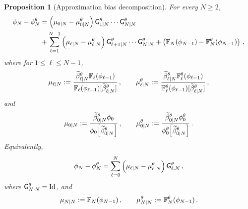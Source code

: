 \documentclass[11pt]{article}
\theoremstyle{plain}
\newtheorem{proposition}[theorem]{Proposition}
\theoremstyle{definition}
\theoremstyle{remark}
\begin{document}
\begin{proposition}[Approximation bias decomposition]
\label{prop:filtering_error_decomposition}
For every $N\ge 2$,
\begin{align*}
\filter{N} - \approxfilter{N}
&= \left( \muBias{0}{N} - \muBias{0}{N}[\theta] \right)  \fsmk{1}{N}[\theta] \cdots \fsmk{N}{N}[\theta] \\
& + \sum_{\ell=1}^{N-1} \left( \muBias{\ell}{N} - \muBias{\ell}{N}[\theta] \right) \fsmk{\ell+1}{N}[\theta] \cdots \fsmk{N}{N}[\theta] + \left( \filtertransform{N} (\filter{N-1}) - \filtertransform{N}[\theta] (\filter{N-1})\right) \eqsp,
\end{align*}
where for $1\le \ell\le N-1$,
$$
\muBias{\ell}{N}
\eqdef \frac{ \normbackwardfun{\ell}{N}[\theta] \filtertransform{\ell} (\filter{\ell-1}) }{ \filtertransform{\ell}(\filter{\ell-1}) [ \normbackwardfun{\ell}{N}[\theta] ] } \eqsp,
\qquad
\muBias{\ell}{N}[\theta] \eqdef \frac{ \normbackwardfun{\ell}{N}[\theta] \filtertransform{\ell}[\theta] (\filter{\ell-1}) }{ \filtertransform{\ell}[\theta](\filter{\ell-1}) [ \normbackwardfun{\ell}{N}[\theta] ] } \eqsp,
$$
and
$$
\muBias{0}{N} \eqdef \frac{ \normbackwardfun{0}{N}[\theta]\filter{0} }{ \filter{0}[\normbackwardfun{0}{N}[\theta]] } \eqsp, 
\qquad
\muBias{0}{N}[\theta] \eqdef \frac{ \normbackwardfun{0}{N}[\theta]\approxfilter{0} }{ \approxfilter{0}[\normbackwardfun{0}{N}[\theta]] } \eqsp.
$$
%
Equivalently,
\begin{align}
\label{eq:kernel_bias_decomposition_approx_forgetting}
\filter{N}-\approxfilter{N} = \sum_{\ell=0}^{N} \left( \muBias{\ell}{N} - \muBias{\ell}{N}[\theta] \right) \prodfsmk{\ell}{N}[\theta] \eqsp,
\end{align}
where $\prodfsmk{N}{N}[\theta]=\operatorname{Id}$, and
$$
\muBias{N}{N} \eqdef \filtertransform{N}(\filter{N-1}) \eqsp,
\qquad
\muBias{N}{N}[\theta] \eqdef \filtertransform{N}[\theta](\filter{N-1}) \eqsp.
$$
\end{proposition}
\end{document}
